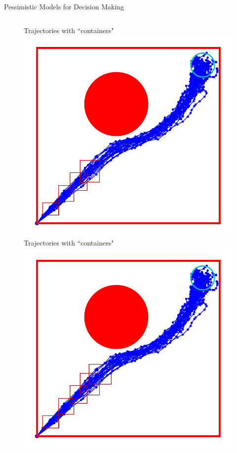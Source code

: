 \documentclass[lecture]{beamer}
\begin{document}
\begin{frame}{\normalsize Pessimistic Models for Decision Making}
\begin{columns}[t]
\begin{overlayarea}{\textwidth}{0.6\textheight}
\begin{figure}
{        }%
        {%
                \center
        Trajectories with ``containers"
   \includegraphics[width=\FS\textwidth]{Codes/BasicsSafety/PessimisticModel4.pdf}%
        }%
        {%
                \center
        Trajectories with ``containers"
  \includegraphics[width=\FS\textwidth]{Codes/BasicsSafety/PessimisticModel5.pdf}%
}
\end{figure}
\end{overlayarea}
\end{columns}
\end{frame}
\end{document}
